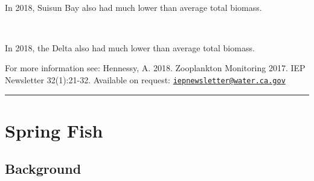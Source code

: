 \documentclass[
]{book}
\begin{document}
\begin{panel-grid}
\begin{columns-nocenter}
\begin{column40}
~

\end{column40}

\begin{column800}

In 2018, Suisun Bay also had much lower than average total biomass.

\end{column800}

\begin{column40}

~

\end{column40}

\begin{column800}

In 2018, the Delta also had much lower than average total biomass.

\end{column800}

\end{columns-nocenter}

\end{panel-grid}

\begin{disclaimer}
For more information see: Hennessy, A. 2018. Zooplankton Monitoring
2017. IEP Newsletter 32(1):21-32. Available on request:
\href{mailto:iepnewsletter@water.ca.gov}{\nolinkurl{iepnewsletter@water.ca.gov}}
\end{disclaimer}

\begin{center}\rule{0.5\linewidth}{0.5pt}\end{center}

\hypertarget{spring-fish}{%
\section{Spring Fish}\label{spring-fish}}

\hypertarget{background-4}{%
\subsection{Background}\label{background-4}}
\end{document}

